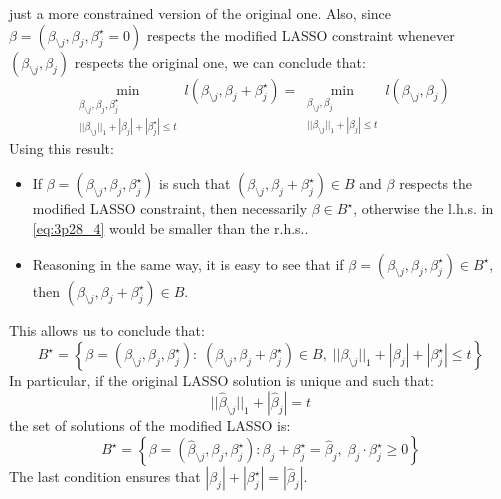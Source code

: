 just a more constrained version of the original one. Also, since $\beta = (\beta_{\setminus j}, \beta_j, \beta_j^\star= 0)$ respects the modified LASSO constraint whenever $(\beta_{\setminus j}, \beta_j)$ respects the original one, we can conclude that:
\begin{equation} \label{eq:3p28_4}
\min_{\substack{\beta_{\setminus j}, \beta_j, \beta_j^\star \\
        ||\beta_{\setminus j}||_1 + |\beta_j| + |\beta_j^\star| \leq t}}
l(\beta_{\setminus j}, \beta_j + \beta_j^\star) = \min_{\substack{\beta_{\setminus j}, \beta_j \\
        ||\beta_{\setminus j}||_1 + |\beta_j| \leq t}}
l(\beta_{\setminus j}, \beta_j)
\end{equation}
Using this result:
\begin{itemize}
    \item If $\beta = (\beta_{\setminus j}, \beta_j, \beta_j^\star)$ is
      such that $(\beta_{\setminus j}, \beta_j + \beta_j^\star) \in B$
      and $\beta$ respects the modified LASSO constraint, then
      necessarily $\beta \in B^\star$, otherwise the l.h.s. in \eqref{eq:3p28_4}
      would be smaller than the r.h.s..
    \item Reasoning in the same way, it is easy to see that if $\beta = (\beta_{\setminus j}, \beta_j, \beta_j^\star) \in B^\star$, then $(\beta_{\setminus j}, \beta_j + \beta_j^\star) \in B$.
\end{itemize}
This allows us to conclude that:
\begin{equation}
B^\star = \left\{\beta = (\beta_{\setminus j}, \beta_j, \beta_j^\star): \;
  (\beta_{\setminus j}, \beta_j + \beta_j^\star) \in B,\;
  ||\beta_{\setminus j}||_1 + |\beta_j| + |\beta_j^\star| \leq t  
\right\}
\end{equation}
In particular, if the original LASSO solution is unique and such that:
\begin{equation*}
||\hat{\beta}_{\setminus j}||_1 + |\hat{\beta}_j| = t
\end{equation*}
the set of solutions of the modified LASSO is:
\begin{equation*}
B^\star = \left\{\beta = \left(\hat{\beta}_{\setminus j}, \beta_j, \beta_j^\star\right): \beta_j + \beta_j^\star = \hat{\beta}_j, \;
\beta_j \cdot \beta_j^\star \geq 0\right\}
\end{equation*}
The last condition ensures that $|\beta_j| + |\beta_j^\star| = |\hat{\beta}_j|$.
